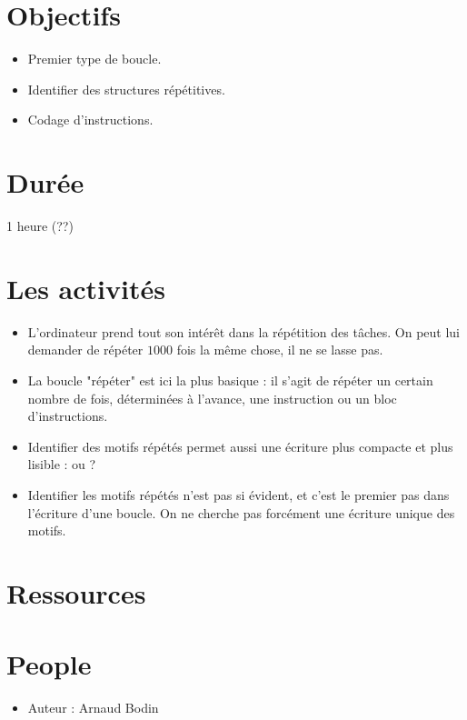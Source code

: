 \documentclass[class=report,crop=false, 12pt]{standalone}
\begin{document}



\section*{Objectifs}

\begin{itemize}
  \item Premier type de boucle.
  \item Identifier des structures répétitives.
  \item Codage d'instructions.
\end{itemize}


\section*{Durée}

1 heure (??)

\section*{Les activités}

\begin{itemize}
  \item L'ordinateur prend tout son intérêt dans la répétition des tâches. On peut lui demander de répéter $1000$ fois la même chose, il ne se lasse pas.
  
  \item La boucle "répéter" est ici la plus basique : il s'agit de répéter un certain nombre de fois, déterminées à l'avance, une instruction ou un bloc d'instructions. 
  
  \item Identifier des motifs répétés permet aussi une écriture plus compacte et plus lisible :  ou  ?
  
  \item Identifier les motifs répétés n'est pas si évident, et c'est le premier pas dans l'écriture d'une boucle. On ne cherche pas forcément une écriture unique des motifs.

\end{itemize}


\section*{Ressources}


\section*{People}

\begin{itemize}
  \item Auteur : Arnaud Bodin
\end{itemize}
\end{document}
